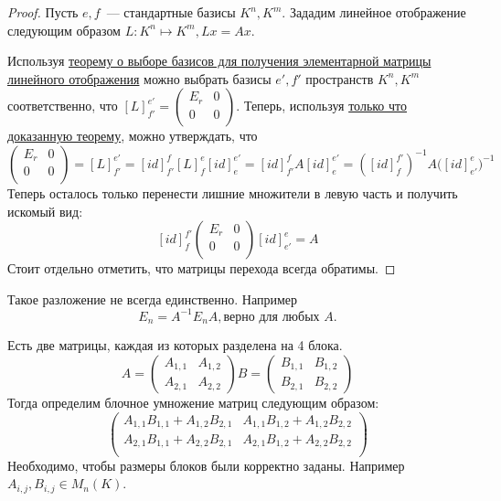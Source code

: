 \begin{proof}
    Пусть $e,f$~--- стандартные базисы $K^n, K^m$.
    Зададим линейное отображение следующим образом $L: K^n\mapsto K^m, Lx = Ax$.

    Используя \hyperref[thm:О выборе базисов для получения элементарной матрицы линейного отображения]{
        теорему о выборе базисов для получения элементарной матрицы линейного отображения}
    можно выбрать базисы $e', f'$ пространств $K^n, K^m$ соответственно,
    что $[L]^{e'}_{f'} = \left(\begin{array}{c|c}
            E_r & 0\\
            \hline
            0 & 0\\
    \end{array}\right)$.
    Теперь, используя \hyperref[thm:О смене базисов в матрице линейного отображения]
    {только что доказанную теорему},
    можно утверждать, что 
    $$\left(\begin{array}{c|c}
            E_r & 0\\
            \hline
            0 & 0\\
    \end{array}\right)=[L]^{e'}_{f'} = [id]^f_{f'}[L]^e_f[id]^{e'}_e =
    [id]^f_{f'}A[id]^{e'}_e= \left([id]^{f'}_f\right)^{-1}A \Big([id]^e_{e'}\Big)^{-1}$$
    Теперь осталось только перенести лишние множители в левую часть и получить
    искомый вид:$$[id]^{f'}_f\left(\begin{array}{c|c}
            E_r & 0\\
            \hline
            0 & 0\\
    \end{array}\right)[id]^e_{e'}=A$$
    Стоит отдельно отметить, что матрицы перехода всегда обратимы.
\end{proof}
\begin{remark}
    Такое разложение не всегда единственно. Например 
    \[
        E_n = A^{-1}E_nA, \text{верно для любых } A.
    \]
\end{remark}
\begin{definition}
    Есть две матрицы, каждая из которых разделена на 4 блока.
    $$
    A = \left(\begin{array}{c|c}
            A_{1,1} & A_{1,2}\\
            \hline
            A_{2,1} & A_{2,2}
    \end{array}\right)
    B = \left(\begin{array}{c|c}
            B_{1,1} & B_{1,2}\\
            \hline
            B_{2,1} & B_{2,2}
    \end{array}\right)$$
    Тогда определим блочное умножение матриц следующим образом:
    $$
    \left(\begin{array}{c|c}
            A_{1,1}B_{1,1} + A_{1,2}B_{2,1} & A_{1,1}B_{1,2} + A_{1,2}B_{2,2}\\
            \hline
            A_{2,1}B_{1,1} + A_{2,2}B_{2,1} & A_{2,1}B_{1,2} + A_{2,2}B_{2,2}\\
    \end{array}\right)
    $$
    Необходимо, чтобы размеры блоков были корректно заданы. Например $A_{i,j}, B_{i,j}\in M_n(K)$.
\end{definition}
